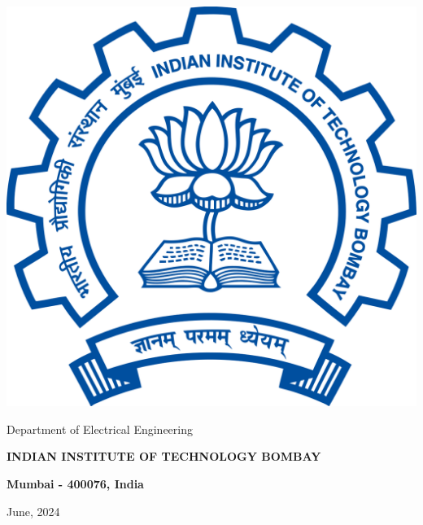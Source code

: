 \begin{titlepage}
\begin{center}
\includegraphics[width=0.25\linewidth]{../figures/iitb_logo.png}
     \vspace{0.6 cm}

    
    {\large Department of Electrical Engineering\par}

    {\large \textbf{INDIAN INSTITUTE OF TECHNOLOGY BOMBAY}\par}
    \vspace{0.4cm}
    {\large \textbf{Mumbai - 400076, India}}
    \vspace{0.4cm}
    
    {\large {June, 2024}}
\end{center}
\end{titlepage}